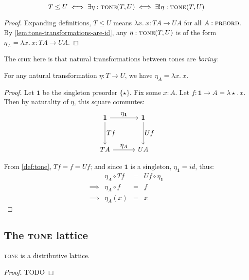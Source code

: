 \documentclass{rntz}
\newcommand{\todo}[1]{{\color{Purple}#1}}
\newcommand{\mb}[1]{\ensuremath{\mathbf{#1}}}
\newcommand{\mi}[1]{\ensuremath{\mathit{#1}}}
\newcommand{\fn}{\lambda}
\newcommand{\binder}{.~}
\newcommand{\bind}[1]{{#1}\binder}
\newcommand{\fnof}[1]{\fn\bind{#1}}
\newcommand{\cat}[1]{\textsc{#1}} %
\newcommand{\Pre}{\cat{preord}}
\newcommand{\Tone}{\cat{tone}}
\newcommand\idfn{\mi{id}}
\begin{document}
\begin{theorem} \label{thm:tone-poset}
  \[T \le U \iff \exists \eta : \Tone(T, U) \iff \exists! \eta : \Tone(T,U)\]
\end{theorem}

\begin{proof}
  Expanding definitions, $T \le U$ means $\fnof{x} x : TA \to
  UA$ for all $A : \Pre$. By \cref{lem:tone-transformations-are-id},
  any $\eta : \Tone(T,U)$ is of the form $\eta_A = \fnof{x} x : TA
  \to UA$.
\end{proof}

The crux here is that natural transformations between tones are \emph{boring}:
\begin{lemma}\label{lem:tone-transformations-are-id}
  For any natural transformation $\eta : T \to U$, we have $\eta_A = \fnof{x}
  x$.
\end{lemma}

\begin{proof}
  Let $\mb{1}$ be the singleton preorder $\{\star\}$. Fix some $x : A$. Let $f :
  \mb{1} \to A = \fnof{\star}{x}$. Then by naturality of $\eta$, this square
  commutes:
  \[\tikzset{
    no line/.style={draw=none,
      commutative diagrams/every label/.append style={/tikz/auto=false}}}
  \begin{tikzcd}[sep=3.3em]
    \mb{1} \arrow[r,"\textstyle \eta_{\mb{1}}"] \arrow[d,"\textstyle Tf"]
    & \mb{1} \arrow[d,"\textstyle Uf"]
    \\ TA \arrow[r,"\textstyle\eta_A"]
    & UA
  \end{tikzcd}\]

From \cref{def:tone}, $Tf = f = Uf$; and since $\mb{1}$ is
a singleton, $\eta_{\mb{1}} = \idfn$, thus:
  \[\begin{array}{rlcl}
  & \eta_A \circ Tf &=& Uf \circ \eta_{\mb{1}}\\
  \implies & \eta_A \circ f &=& f\\
  \implies & \eta_A(x) &=& x
  \end{array}\]
\end{proof}


\subsection{The \Tone{} lattice}

\begin{conjecture}
  \Tone{} is a distributive lattice.
\end{conjecture}
\begin{proof}
  \todo{TODO}
\end{proof}
\end{document}
